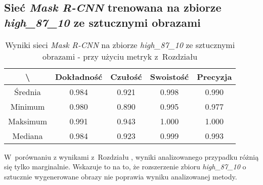 \subsection{Sieć \textit{Mask R-CNN} trenowana na zbiorze \textit{high\_87\_10} ze sztucznymi obrazami}
\label{sec:results_high_original_generated}

\begin{table}[H]
	\centering
	\caption{Wyniki sieci \textit{Mask R-CNN} na zbiorze \textit{high\_87\_10} ze sztucznymi obrazami - przy użyciu metryk z~Rozdziału }
	\vspace{6pt}
	{\footnotesize
		\begin{tabular}{|c|c|c|c|c|}
      \hline \textbackslash & Dokładność & Czułość & Swoistość & Precyzja \\
      \hline Średnia & 0.984 & 0.921 & 0.998 & 0.990 \\
      \hline Minimum & 0.980 & 0.890 & 0.995 & 0.977 \\
      \hline Maksimum & 0.991 & 0.943 & 1.000 & 1.000 \\
      \hline Mediana & 0.984 & 0.923 & 0.999 & 0.993 \\
      \hline
		\end{tabular}
	}
  \vspace{0pt}
  \label{Tab:high_original_generated_calculated}
\end{table}

W~porównaniu z wynikami z~Rozdziału , wyniki analizowanego przypadku różnią się tylko marginalnie. Wskazuje to na to, że rozszerzenie zbioru \textit{high\_87\_10} o sztucznie wygenerowane obrazy nie poprawia wyniku analizowanej metody.

